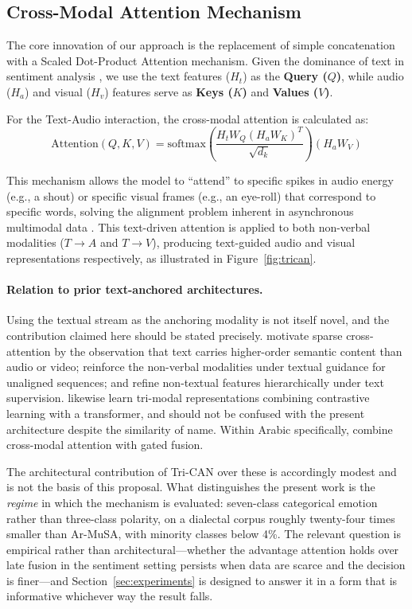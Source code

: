 \documentclass[12pt, a4paper]{article}
\begin{document}
\subsection{Cross-Modal Attention Mechanism}
The core innovation of our approach is the replacement of simple concatenation with a Scaled Dot-Product Attention mechanism. Given the dominance of text in sentiment analysis \citep{Alqarafi2019}, we use the text features ($H_t$) as the \textbf{Query ($Q$)}, while audio ($H_a$) and visual ($H_v$) features serve as \textbf{Keys ($K$)} and \textbf{Values ($V$)}.

For the Text-Audio interaction, the cross-modal attention is calculated as:
\begin{equation}
    \text{Attention}(Q, K, V) = \text{softmax}\left(\frac{H_t W_Q (H_a W_K)^T}{\sqrt{d_k}}\right) (H_a W_V)
\end{equation}

This mechanism allows the model to ``attend'' to specific spikes in audio energy (e.g., a shout) or specific visual frames (e.g., an eye-roll) that correspond to specific words, solving the alignment problem inherent in asynchronous multimodal data \citep{Haouhat2023}. This text-driven attention is applied to both non-verbal modalities ($T\rightarrow A$ and $T\rightarrow V$), producing text-guided audio and visual representations respectively, as illustrated in Figure~\ref{fig:trican}.

\paragraph{Relation to prior text-anchored architectures.} Using the textual stream as the anchoring modality is not itself novel, and the contribution claimed here should be stated precisely. \citet{Wang2022} motivate sparse cross-attention by the observation that text carries higher-order semantic content than audio or video; \citet{arXiv230713205v1} reinforce the non-verbal modalities under textual guidance for unaligned sequences; and \citet{Su2025} refine non-textual features hierarchically under text supervision. \citet{Yang2024} likewise learn tri-modal representations combining contrastive learning with a transformer, and should not be confused with the present architecture despite the similarity of name. Within Arabic specifically, \citet{Cheikhi2026} combine cross-modal attention with gated fusion.

The architectural contribution of Tri-CAN over these is accordingly modest and is not the basis of this proposal. What distinguishes the present work is the \emph{regime} in which the mechanism is evaluated: seven-class categorical emotion rather than three-class polarity, on a dialectal corpus roughly twenty-four times smaller than Ar-MuSA, with minority classes below 4\%. The relevant question is empirical rather than architectural---whether the advantage attention holds over late fusion in the sentiment setting persists when data are scarce and the decision is finer---and Section~\ref{sec:experiments} is designed to answer it in a form that is informative whichever way the result falls.
\end{document}
